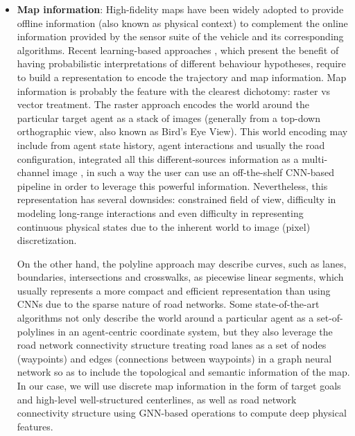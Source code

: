 \begin{itemize}
	\item \textbf{Map information}: High-fidelity maps \cite{can2022maps} have been widely adopted to provide offline information (also known as physical context) to complement the online information provided by the sensor suite of the vehicle and its corresponding algorithms. Recent learning-based approaches \cite{mahjourian2022occupancy, casas2018intentnet, ivanovic2021heterogeneous}, which present the benefit of having probabilistic interpretations of different behaviour hypotheses, require to build a representation to encode the trajectory and map information. Map information is probably the feature with the clearest dichotomy: raster vs vector treatment. The raster approach encodes the world around the particular target agent as a stack of images (generally from a top-down orthographic view, also known as Bird's Eye View). This world encoding may include from agent state history, agent interactions and usually the road configuration, integrated all this different-sources information as a multi-channel image \cite{gilles2021home}, in such a way the user can use an off-the-shelf \ac{CNN}-based pipeline in order to leverage this powerful information. Nevertheless, this representation has several downsides: constrained field of view, difficulty in modeling long-range interactions and even difficulty in representing continuous physical states due to the inherent world to image (pixel) discretization. 
	
	On the other hand, the polyline approach may describe curves, such as lanes, boundaries, intersections and crosswalks, as piecewise linear segments, which usually represents a more compact and efficient representation than using \acp{CNN} due to the sparse nature of road networks. Some state-of-the-art algorithms not only describe the world around a particular agent as a set-of-polylines \cite{khandelwal2020if} \cite{zhao2021tnt} in an agent-centric coordinate system, but they also leverage the road network connectivity structure \cite{liang2020learning} \cite{zeng2021lanercnn} treating road lanes as a set of nodes (waypoints) and edges (connections between waypoints) in a graph neural network so as to include the topological and semantic information of the map. In our case, we will use discrete map information in the form of target goals and high-level well-structured centerlines, as well as road network connectivity structure using \ac{GNN}-based operations to compute deep physical features.
	

\end{itemize}
